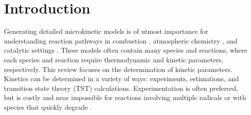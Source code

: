 \documentclass[preprint, 11pt]{elsarticle} %
\begin{document}
\newcommand{\ndh}[2][]
{\todo[caption={#2}, size=\small, color=orange!20,  #1]{\renewcommand{\baselinestretch}{0.5}\selectfont#2\par}}
\ndh[inline]{Comments by Nate}



\newcommand\figref{Figure~\ref}
\newcommand\tabref{Table~\ref}
\newcommand\eqnref{Equation~\ref}



\section{Introduction}
% 

Generating detailed microkinetic models is of utmost importance for understanding reaction pathways in combustion \cite{VandeVijver:2015}, atmospheric chemistry \cite{Vereecken:2012}, and catalytic settings \cite{STOLTZE:2000}.
These models often contain many species and reactions, where each species and reaction require thermodynamic and kinetic parameters, respectively.  
This review focuses on the determination of kinetic parameters.
Kinetics can be determined in a variety of ways: experiments, estimations, and transition state theory (TST) calculations.
Experimentation is often preferred, but is costly and near impossible for reactions involving multiple radicals or with species that quickly degrade \cite{Sabbe:2005}.
\end{document}
